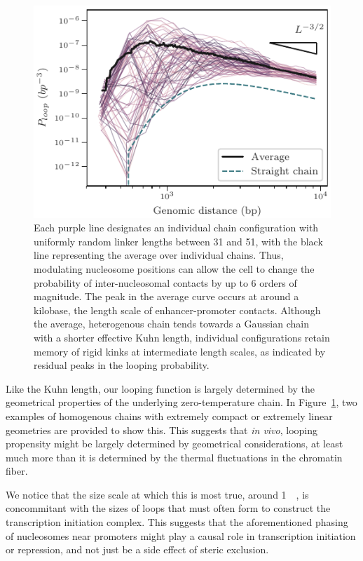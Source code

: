 \documentclass[%
 reprint,
superscriptaddress,
showpacs,preprintnumbers,
 amsmath,amssymb,
 aps,
 prl,
]{revtex4-1}
\begin{document}
\begin{figure}[t]
    \centering
    \includegraphics{./figures/fig5_looping_hetero31to52bp.pdf}
    \caption{Each purple line designates an individual chain configuration
    with uniformly random linker lengths between 31 and \SI{51}{\basepair}, with
    the black line representing the average over individual chains. Thus, modulating nucleosome positions can allow the cell to change
    the probability of inter-nucleosomal contacts by up to 6 orders of
    magnitude. The peak in the average curve occurs at around a kilobase, the
    length scale of enhancer-promoter contacts. Although the average,
    heterogenous chain tends towards a Gaussian chain with a shorter
    effective Kuhn length, individual configurations retain memory of rigid kinks
    at intermediate length scales, as indicated by residual peaks in the looping
    probability.}\label{fig:looping}
\end{figure}

Like the Kuhn length, our looping function is largely determined by the
    geometrical properties of the underlying zero-temperature chain.
In Figure~\ref{fig:looping}, two examples of homogenous chains with extremely
    compact or extremely linear geometries are provided to show this.
This suggests that \textit{in vivo}, looping propensity might be largely
    determined by geometrical considerations, at least much more than it is
    determined by the thermal fluctuations in the chromatin fiber.

We notice that the size scale at which this is most true, around
    \SI{1}{\kilo\basepair}, is concommitant with the sizes of loops that must
    often form to construct the transcription initiation complex.
This suggests that the aforementioned phasing of nucleosomes near promoters
    might play a causal role in transcription initiation or repression, and not
    just be a side effect of steric exclusion.
\end{document}
